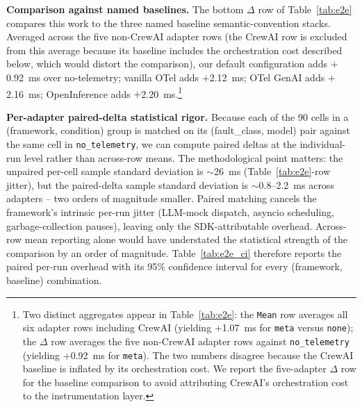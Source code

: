 \documentclass[sigconf,review,anonymous,9pt]{acmart}
\begin{document}
\textbf{Comparison against named baselines.} The bottom $\Delta$ row
of Table~\ref{tab:e2e} compares this work to the three named
baseline semantic-convention stacks. Averaged across the five
non-CrewAI adapter rows (the CrewAI row is excluded from this
average because its baseline includes the orchestration cost
described below, which would distort the comparison), our default
configuration adds $+$0.92~ms over no-telemetry; vanilla OTel adds
$+$2.12~ms; OTel GenAI adds $+$2.16~ms; OpenInference adds
$+$2.20~ms.\footnote{Two distinct aggregates appear in
Table~\ref{tab:e2e}: the \texttt{Mean} row averages all six
adapter rows including CrewAI (yielding $+$1.07~ms for
\texttt{meta} versus \texttt{none}); the $\Delta$ row averages the
five non-CrewAI adapter rows against \texttt{no\_telemetry}
(yielding $+$0.92~ms for \texttt{meta}). The two numbers disagree
because the CrewAI baseline is inflated by its orchestration cost.
We report the five-adapter $\Delta$ row for the baseline comparison
to avoid attributing CrewAI's orchestration cost to the
instrumentation layer.}

\textbf{Per-adapter paired-delta statistical rigor.}
Because each of the 90 cells in a (framework, condition) group is
matched on its (fault\_class, model) pair against the same cell in
\texttt{no\_telemetry}, we can compute paired deltas at the
individual-run level rather than across-row means. The methodological
point matters: the unpaired per-cell sample standard deviation is
$\sim$26~ms (Table~\ref{tab:e2e}-row jitter), but the paired-delta
sample standard deviation is $\sim$0.8--2.2~ms across adapters --
two orders of magnitude smaller. Paired matching cancels the
framework's intrinsic per-run jitter (LLM-mock dispatch, asyncio
scheduling, garbage-collection pauses), leaving only the SDK-attributable
overhead. Across-row mean reporting alone would have understated the
statistical strength of the comparison by an order of magnitude.
Table~\ref{tab:e2e_ci} therefore reports the paired per-run overhead
with its 95\% confidence interval for every (framework, baseline)
combination.
\end{document}

